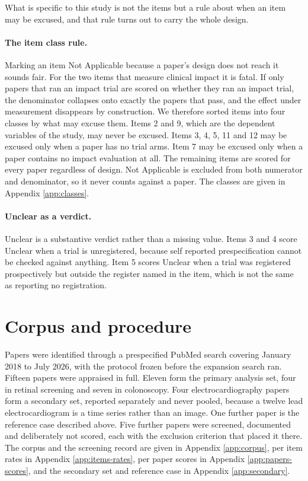 \documentclass{article}
\begin{document}
What is specific to this study is not the items but a rule about when an item may be excused, and
that rule turns out to carry the whole design.

\paragraph{The item class rule.} Marking an item Not Applicable because a paper's design does not
reach it sounds fair. For the two items that measure clinical impact it is fatal. If only papers
that ran an impact trial are scored on whether they ran an impact trial, the denominator collapses
onto exactly the papers that pass, and the effect under measurement disappears by construction. We
therefore sorted items into four classes by what may excuse them. Items 2 and 9, which are the
dependent variables of the study, may never be excused. Items 3, 4, 5, 11 and 12 may be excused
only when a paper has no trial arms. Item 7 may be excused only when a paper contains no impact
evaluation at all. The remaining items are scored for every paper regardless of design. Not
Applicable is excluded from both numerator and denominator, so it never counts against a paper. The
classes are given in Appendix \ref{app:classes}.

\paragraph{Unclear as a verdict.} Unclear is a substantive verdict rather than a missing value.
Items 3 and 4 score Unclear when a trial is unregistered, because self reported prespecification
cannot be checked against anything. Item 5 scores Unclear when a trial was registered prospectively
but outside the register named in the item, which is not the same as reporting no registration.

\section{Corpus and procedure}
\label{sec:corpus}

Papers were identified through a prespecified PubMed search covering January 2018 to July 2026,
with the protocol frozen before the expansion search ran. Fifteen papers were appraised in full.
Eleven form the primary analysis set, four in retinal screening and seven in colonoscopy. Four
electrocardiography papers form a secondary set, reported separately and never pooled, because a
twelve lead electrocardiogram is a time series rather than an image. One further paper is the
reference case described above. Five further papers were screened, documented and deliberately not
scored, each with the exclusion criterion that placed it there. The corpus and the screening record
are given in Appendix \ref{app:corpus}, per item rates in Appendix \ref{app:items-rates}, per paper
scores in Appendix \ref{app:papers-scores}, and the secondary set and reference case in Appendix
\ref{app:secondary}.
\end{document}
